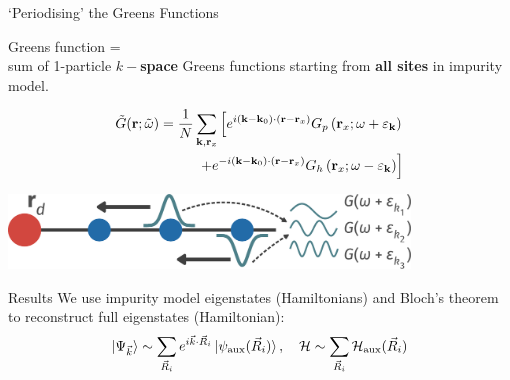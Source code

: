 \documentclass[12pt,aspectratio=169]{beamer}
\newcommand\focus[1]{%
	{\alert{\textbf{#1}}}
}
\begin{document}
\begin{frame}{`Periodising' the Greens Functions}
	\begin{minipage}{0.43\textwidth}
	Greens function = \\
	sum of 1-particle \focus{\(k-\)space} Greens functions starting from \focus{all sites} in impurity model.
	\end{minipage}
	\begin{minipage}{0.54\textwidth}
	\begin{equation*}\begin{aligned}
		\tilde G({\bf r}; \tilde\omega) = \frac{1}{N}\sum_{{\bf k},{\bf r}_x} \left[e^{i \left({\bf k}- {\bf k}_0\right)\cdot\left({\bf r} - {\bf r}_x\right)}G_p\left({\bf r}_x;\omega + \varepsilon_{\bf k}\right) \right. \\
	\left. + e^{-i \left({\bf k}- {\bf k}_0\right)\cdot\left({\bf r} - {\bf r}_x\right)}G_h\left({\bf r}_x;\omega - \varepsilon_{\bf k}\right)\right]
	\end{aligned}\end{equation*}
	\end{minipage}

	\vspace*{\fill}
	\includegraphics[width=0.8\textwidth]{greensFunc.pdf}
	
\end{frame}

\begin{frame}{Results}
\flushleft
We use impurity model eigenstates (Hamiltonians) and \alert{Bloch's theorem} to reconstruct full eigenstates (Hamiltonian):
\[\ket{\Psi_{\vec k}} \sim \sum_{\vec R_i} e^{i \vec{k}\cdot\vec{R}_i} \ket{\psi_\text{aux}(\vec R_i)},\quad\mathcal{H} \sim \sum_{\vec R_i} \mathcal{H}_\text{aux}(\vec R_i)\]
\vspace*{\fill}
\end{frame}
\end{document}

